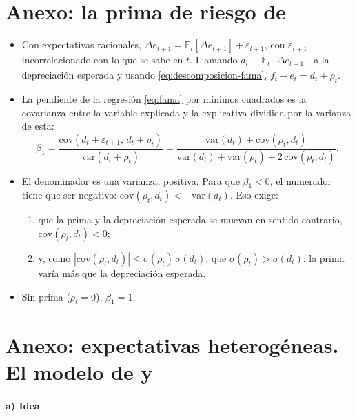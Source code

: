 \documentclass[11pt]{article}
\begin{document}
\section{Anexo: la prima de riesgo de }\label{anexo:fama}

\begin{itemize}
\item Con expectativas racionales, $\Delta e_{t+1}=\mathbb{E}_t[\Delta e_{t+1}]+\varepsilon_{t+1}$, con $\varepsilon_{t+1}$ incorrelacionado con lo que se sabe en $t$. Llamando $d_t\equiv\mathbb{E}_t[\Delta e_{t+1}]$ a la depreciación esperada y usando \eqref{eq:descomposicion-fama}, $f_t-e_t=d_t+\rho_t$.
\item La pendiente de la regresión \eqref{eq:fama} por mínimos cuadrados es la covarianza entre la variable explicada y la explicativa dividida por la varianza de esta:
  \begin{equation}\label{eq:beta-fama}
  \beta_1=\frac{\mathrm{cov}(d_t+\varepsilon_{t+1},\,d_t+\rho_t)}{\mathrm{var}(d_t+\rho_t)}=\frac{\mathrm{var}(d_t)+\mathrm{cov}(\rho_t,d_t)}{\mathrm{var}(d_t)+\mathrm{var}(\rho_t)+2\,\mathrm{cov}(\rho_t,d_t)} .
  \end{equation}
\item El denominador es una varianza, positiva. Para que $\beta_1<0$, el numerador tiene que ser negativo: $\mathrm{cov}(\rho_t,d_t)<-\mathrm{var}(d_t)$. Eso exige:
  \begin{enumerate}
  \item que la prima y la depreciación esperada se muevan en sentido contrario, $\mathrm{cov}(\rho_t,d_t)<0$;
  \item y, como $|\mathrm{cov}(\rho_t,d_t)|\leq\sigma(\rho_t)\,\sigma(d_t)$, que $\sigma(\rho_t)>\sigma(d_t)$: la prima varía más que la depreciación esperada\nocite{Fama1984Forward}.
  \end{enumerate}
\item Sin prima ($\rho_t=0$), $\beta_1=1$.\findemo
\end{itemize}

\section{Anexo: expectativas heterogéneas.\cortetitulo{} El modelo de  y }\label{anexo:degrauwe}

\paragraph{a) Idea}
\end{document}

